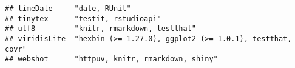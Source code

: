 \documentclass[]{article}
\begin{document}
\begin{verbatim}
## timeDate     "date, RUnit"                                                                                                                                                                                                                                                                                                                                                                                                                                                                                                                                                                             
## tinytex      "testit, rstudioapi"                                                                                                                                                                                                                                                                                                                                                                                                                                                                                                                                                                      
## utf8         "knitr, rmarkdown, testthat"                                                                                                                                                                                                                                                                                                                                                                                                                                                                                                                                                              
## viridisLite  "hexbin (>= 1.27.0), ggplot2 (>= 1.0.1), testthat, covr"                                                                                                                                                                                                                                                                                                                                                                                                                                                                                                                                  
## webshot      "httpuv, knitr, rmarkdown, shiny"                                                                                                                                                                                                                                                                                                                                                                                                                                                                                                                                                         

\end{verbatim}
\end{document}
